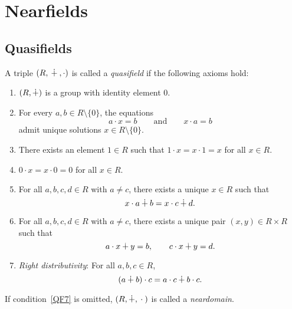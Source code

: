 \chapter{Nearfields}
\label{ch:nearfields}

\section{Quasifields}

\begin{defn}\label{defn:quasifield}
    A triple $(R,{}\dotplus{},\cdot)$ is called a \textsl{quasifield} if the following axioms hold:
    \begin{enumerate}[label=qf$_{\arabic*}$,font=\scshape]
        \item\label{QF1} $(R,\dotplus)$ is a group with identity element $0$.
        \item\label{QF2} For every $a,b\in R\setminus\{0\}$, the equations
            \[
                a\cdot x = b
                \qquad\text{and}\qquad
                x\cdot a = b
            \]
            admit unique solutions $x\in R\setminus\{0\}$.
        \item\label{QF3} There exists an element $1\in R$ such that $1\cdot x = x\cdot 1 = x$ for all $x\in R$.
        \item\label{QF4} $0\cdot x = x\cdot 0 = 0$ for all $x\in R$.
        \item\label{QF5} For all $a,b,c,d\in R$ with $a\ne c$, there exists a unique $x\in R$ such that
            \[
                x\cdot a \dotplus b = x\cdot c \dotplus d.
            \]
        \item\label{QF6} For all $a,b,c,d\in R$ with $a\ne c$, there exists a unique pair $(x,y)\in R\times R$ such that
            \[
                a\cdot x \dotplus y = b,
                \qquad
                c\cdot x \dotplus y = d.
            \]
        \item\label{QF7} \textsl{Right distributivity}: For all $a,b,c\in R$,
            \[
                (a\dotplus b)\cdot c = a\cdot c \dotplus b\cdot c.
            \]
    \end{enumerate}
    If condition~\textsc{\ref{QF7}} is omitted, $(R,\dotplus,{}\cdot{})$ is called a \textsl{neardomain}.
\end{defn}

